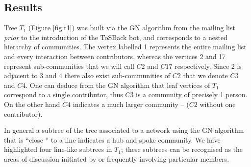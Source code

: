 \documentclass{sig-alternate-2013}
\begin{document}
\subsection{Results}
Tree $T_1$ (Figure \ref{fig:t1}) was built via the GN algorithm from the mailing list \emph{prior} to the introduction of the ToSBack bot, and corresponds to a nested hierarchy of communities. The vertex labelled 1 represents the entire mailing list and every interaction between contributors, whereas the vertices 2 and 17 represent sub-communities that we will call $C2$ and $C17$ respectively. Since 2 is adjacent to 3 and 4 there also exist sub-communities of $C2$ that we denote $C3$ and $C4$. One can deduce from the GN algorithm that leaf vertices of $T_1$ correspond to a single contributor, thus $C3$ is a community of precisely 1 person. On the other hand $C4$ indicates a much larger community – ($C2$ without one contributor).

In general a subtree of the tree associated to a network using the GN algorithm that is “close ” to a line indicates a hub and spoke community. We have highlighted four line-like subtrees in $T_1$; these subtrees can be recognised as the areas of discussion initiated by or frequently involving particular members.
\end{document}
